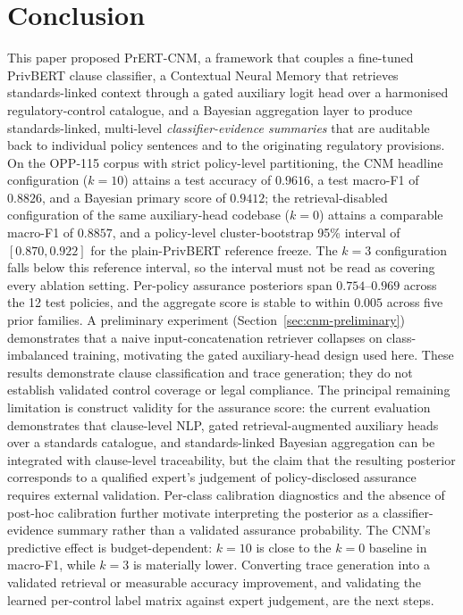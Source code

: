 \documentclass[final,3p,times,twocolumn]{elsarticle}
\begin{document}
	\section{Conclusion}
	\label{sec:conclusion} 

    
	This paper proposed PrERT-CNM, a framework that couples a fine-tuned PrivBERT
	clause classifier, a Contextual Neural Memory that retrieves standards-linked context
	through a gated auxiliary logit head over a harmonised regulatory-control catalogue,
	and a Bayesian aggregation layer to produce standards-linked, multi-level
	\emph{classifier-evidence summaries} that are auditable back to individual
	policy sentences and to the originating regulatory provisions. On the OPP-115 corpus
	with strict policy-level
	partitioning, the CNM headline configuration ($k = 10$) attains a test
	accuracy of $0.9616$, a test macro-F1 of $0.8826$, and a Bayesian primary
	score of $0.9412$; the retrieval-disabled configuration of the same auxiliary-head
	codebase ($k = 0$) attains a comparable macro-F1 of $0.8857$, and a policy-level
	cluster-bootstrap 95\% interval of $[0.870, 0.922]$ for the plain-PrivBERT
	reference freeze. The $k=3$ configuration falls below this reference interval,
	so the interval must not be read as covering every ablation setting. Per-policy
	assurance posteriors span $0.754$--$0.969$ across the
	12 test policies, and the aggregate score is stable to within $0.005$ across
	five prior families. A preliminary experiment (Section~\ref{sec:cnm-preliminary})
	demonstrates that a naive input-concatenation retriever collapses on class-imbalanced
	training, motivating the gated auxiliary-head design used here. These results
	demonstrate clause classification and trace generation; they do not establish
	validated control coverage or legal compliance.
	The principal remaining limitation is construct validity for the assurance
	score: the current evaluation demonstrates that clause-level NLP, gated
	retrieval-augmented auxiliary heads over a standards catalogue, and standards-linked
	Bayesian aggregation can be integrated with clause-level traceability, but the
	claim that the resulting posterior corresponds to a qualified expert's
	judgement of policy-disclosed assurance requires external validation. Per-class
	calibration diagnostics and the absence of post-hoc calibration further motivate
	interpreting the posterior as a classifier-evidence summary rather than a
	validated assurance probability. The CNM's predictive effect is budget-dependent:
	$k=10$ is close to the $k=0$ baseline in macro-F1, while $k=3$ is materially
	lower. Converting trace generation into a validated retrieval or measurable
	accuracy improvement,
	and validating the learned per-control label matrix against expert judgement, are
	the next steps.
\end{document}
